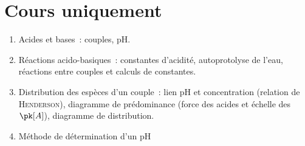 \documentclass[a4paper, 12pt, final, garamond]{book}
\begin{document}
\section{Cours uniquement}
\begin{enumerate}[label=\Roman*]
	\item{Acides et bases}~: couples, pH.
	\item{Réactions acido-basiques}~: constantes
	d'acidité, autoprotolyse de l'eau, réactions entre couples et calculs de
	constantes.
	\item{Distribution des espèces d'un couple}~: lien pH et concentration
	(relation de \textsc{Henderson}), diagramme de prédominance (force des
	acides et échelle des $\pk[A]$), diagramme
	de distribution.
	\item{Méthode de détermination d'un pH}
\end{enumerate}
\end{document}
